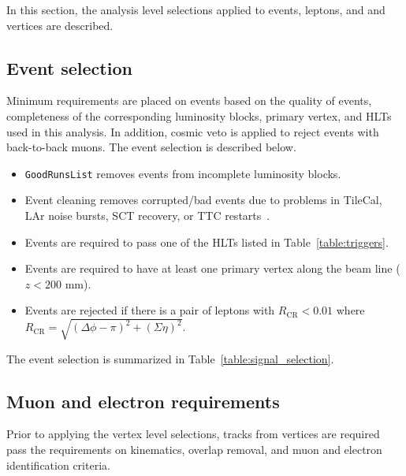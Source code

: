 In this section, the analysis level selections applied to events, leptons, and and vertices are described.

\subsection{Event selection}
\label{sec:event_selection}
Minimum requirements are placed on events based on the quality of events, completeness of the corresponding luminosity blocks, primary vertex, and HLTs used in this analysis. In addition, cosmic veto is applied to reject events with back-to-back muons. The event selection is described below.

\begin{itemize}
    \item \texttt{GoodRunsList} removes events from incomplete luminosity blocks.
    \item Event cleaning removes corrupted/bad events due to problems in TileCal, LAr noise bursts, SCT recovery, or TTC restarts~\cite{ElectronPhotonRun2}.
    \item Events are required to pass one of the HLTs listed in Table~\ref{table:triggers}.
    \item Events are required to have at least one primary vertex along the beam line ($z<200$ \si{\mm}).
    \item Events are rejected if there is a pair of leptons with $R_{\mathrm{CR}} < 0.01$ where $R_{\mathrm{CR}} = \sqrt{(\Delta \phi - \pi)^{2} + (\Sigma \eta)^{2}}$.
\end{itemize}

The event selection is summarized in Table~\ref{table:signal_selection}.

\subsection{Muon and electron requirements}
\label{sec:muon_electron_selection}
Prior to applying the vertex level selections, tracks from vertices are required pass the requirements on kinematics, overlap removal, and muon and electron identification criteria.


